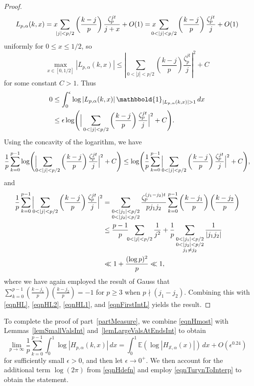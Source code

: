 \documentclass[reqno]{amsart}
\numberwithin{equation}{section}
\numberwithin{table}{section}
\numberwithin{figure}{section}
\newcommand{\leg}[2]{\left(\frac{#1}{#2}\right)}
\newcommand{\abs}[1]{\left\lvert#1\right\rvert}
\begin{document}
\begin{proof}
\[
L_{p,\alpha}(k,x)
= x\hspace{-1ex}\sum_{\abs{j}<p/2} \leg{k-j}{p} \frac{\zeta_p^{jt}}{j+x} + O(1)
= x\hspace{-2ex}\sum_{0<\abs{j}<p/2} \leg{k-j}{p} \frac{\zeta_p^{jt}}{j} + O(1)
\]
uniformly for $0\leq x\leq 1/2$, so
\[
\max_{x\in[0,1/2]} \abs{L_{p,\alpha}(k,x)}
\leq
\abs{\sum_{0<\abs{j}<p/2}\leg{k-j}{p} \frac{\zeta_p^{jt}}{j}}^2 + C
\]
for some constant $C>1$.
Thus
\begin{equation}\label{eqnFirstIntL}
\begin{split}
0
&\leq
\int_0^\epsilon \log\abs{L_{p,\alpha}(k,x)} \mathbbold{1}_{\abs{L_{p,\alpha}(k,x)}>1}\,dx\\
&\leq
\epsilon\log\Biggl(\Big|\sum_{0<\abs{j}<p/2}\leg{k-j}{p} \frac{\zeta_p^{jt}}{j}\Big|^2 + C\Biggr).
\end{split}
\end{equation}
Using the concavity of the logarithm, we have
\[
\frac{1}{p} \sum_{k=0}^{p-1} \log\Biggl(\Big|\hspace{-1ex}\sum_{0<\abs{j}<p/2}\leg{k-j}{p} \frac{\zeta_p^{jt}}{j}\Big|^2 + C\Biggr)
\leq
\log\Biggl(\frac{1}{p} \sum_{k=0}^{p-1} \Big|\hspace{-1ex}\sum_{0<\abs{j}<p/2}\leg{k-j}{p} \frac{\zeta_p^{jt}}{j}\Big|^2 + C\Biggr),
\]
and
\begin{align*}
\frac{1}{p} \sum_{k=0}^{p-1} \Big|\hspace{-1ex}\sum_{0<\abs{j}<p/2}\leg{k-j}{p} \frac{\zeta_p^{jt}}{j}\Big|^2
&=
\sum_{\substack{0<\abs{j_1}<p/2\\0<\abs{j_2}<p/2}}
\frac{\zeta_p^{(j_1-j_2)t}}{p j_1 j_2} \sum_{k=0}^{p-1}
\leg{k-j_1}{p}\leg{k-j_2}{p}\\
&\leq
\frac{p-1}{p} \hspace{-1ex} \sum_{0<\abs{j}<p/2} \frac{1}{j^2} + \frac{1}{p} \sum_{\substack{0<\abs{j_1}<p/2\\0<\abs{j_2}<p/2\\j_1\neq j_2}} \frac{1}{\abs{j_1 j_2}}\\
&\ll
1 + \frac{(\log p)^2}{p} \ll 1,
\end{align*}
where we have again employed the result of Gauss that $\sum_{k=0}^{p-1} \leg{k-j_1}{p}\leg{k-j_2}{p}=-1$ for $p\geq3$ when $p\nmid(j_1-j_2)$.
Combining this with \eqref{eqnHL}, \eqref{eqnHL2}, \eqref{eqnHL1}, and \eqref{eqnFirstIntL} yields the result.
\end{proof}

To complete the proof of part~\ref{partMeasure}, we combine \eqref{eqnHmost} with Lemmas~\ref{lemSmallValsInt} and~\ref{lemLargeValsAtEndsInt} to obtain
\[
\lim_{p\to\infty} \frac{1}{p} \sum_{k=0}^{p-1} \int_0^1 \log \abs{H_{p,\alpha}(k,x)} \, dx
=
\int_0^1 \mathbb{E}\left(\log\abs{H_{\mathbb{X},\alpha}(x)}\right)\,dx + O\left(\epsilon^{0.24}\right)
\]
for sufficiently small $\epsilon>0$, and then let $\epsilon\to0^+$.
We then account for the additional term $\log(2\pi)$ from \eqref{eqnHdefn} and employ \eqref{eqnTurynToInterp} to obtain the statement. 
\end{document}
